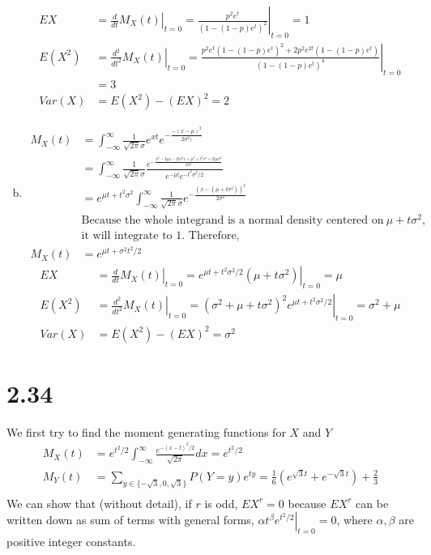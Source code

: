 \documentclass[letter]{article}
\newcommand{\intii}{\int_{-\infty}^\infty}
\newcommand{\mgf}{M_X(t)}
\begin{document}
\begin{enumerate}[(a)]
    \begin{align*}
    EX & = \left. \frac{d}{dt} \mgf\right|_{t=0} = \left. \frac{p^2e^t}{\left(1-(1-p)e^t\right)^2}\right|_{t=0} = 1\\
    E(X^2) & = \left. \frac{d^2}{dt^2} \mgf\right|_{t=0} = \left. \frac{p^2e^t\left(1-(1-p)e^t\right)^2 + 2p^2e^{2t}\left(1-(1-p)e^t\right)}{\left(1-(1-p)e^t\right)^4}\right|_{t=0} \\
    & = 3 \\
    Var(X) & = E(X^2) - (EX)^2 = 2
    \end{align*}
    \item \begin{align*}
    \mgf & = \intii \frac{1}{\sqrt{2\pi}\sigma} e^{xt} e^{-\frac{-(x-\mu)^2}{2\sigma^2)}} \\
    & = \intii \frac{1}{\sqrt{2\pi}\sigma} \frac{e^{-\frac{x^2 - 2\mu x - 2t\sigma^2 x + \mu^2 + t^2\sigma^4 + 2t\mu\sigma^2}{2\sigma^2}}}{e^{-\mu t}e^{-t^2\sigma^2/2}} \\
    & = e^{\mu t + t^2\sigma^2} \intii \frac{1}{\sqrt{2\pi} \sigma} e^{-\frac{\left(x-(\mu + t\sigma^2)\right)^2}{2\sigma^2}} \\
    & \text{Because the whole integrand is a normal density centered on}~\mu+t\sigma^2, \\
    & \text{it will integrate to 1. Therefore, }\\
    \mgf & = e^{\mu t + \sigma^2 t^2/2}
    \end{align*}
    \begin{align*}
    EX & = \left. \frac{d}{dt} \mgf\right|_{t=0} = \left. e^{\mu t + t^2\sigma^2/2}(\mu+t\sigma^2)\right|_{t=0} = \mu \\
    E(X^2) & = \left. \frac{d^2}{dt^2} \mgf\right|_{t=0} = \left.
    (\sigma^2 + \mu + t\sigma^2)^2 e^{\mu t + t^2\sigma^2/2}\right|_{t=0} = \sigma^2 + \mu \\
    Var(X) & = E(X^2) - (EX)^2 = \sigma^2 
    \end{align*}
    \end{enumerate}

    \section*{2.34}
    We first try to find the moment generating functions for $X$ and $Y$
    \begin{align*}
    \mgf & = e^{t^2/2} \intii \frac{e^{-(x-t)^2/2}}{\sqrt{2\pi}} dx = e^{t^2/2} \\
    M_Y(t) & = \sum_{y \in \{-\sqrt{3}, 0, \sqrt{3}\}} P(Y = y) e^{ty} = \frac{1}{6} (e^{\sqrt{3}t} + e^{-\sqrt{3}t}) + \frac{2}{3} \\
    \end{align*}
    We can show that (without detail), if $r$ is odd, $EX^r= 0$ because $EX^r$ can be written down as sum of terms with general forms,
    $\left. \alpha t^\beta e^{t^2/2}\right|_{t=0} = 0$, where $\alpha, \beta$ are positive integer constants.
\end{document}
